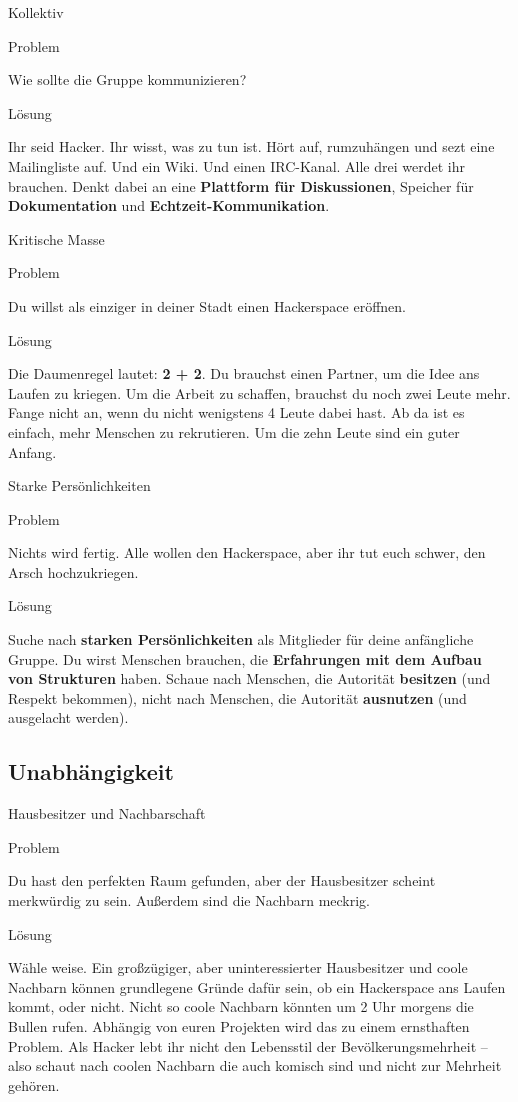\documentclass{beamer}
\newcommand{\pattern}[2]{
  \begin{alertblock}{Problem}
    #1
  \end{alertblock}
  \pause
  \begin{exampleblock}{Lösung}
    #2
  \end{exampleblock}
}
\begin{document}
  \begin{frame}{Kollektiv}
    \pattern{
      Wie sollte die Gruppe kommunizieren?
    }{
      Ihr seid Hacker. Ihr wisst, was zu tun ist. Hört auf, rumzuhängen und sezt
      eine Mailingliste auf. Und ein Wiki. Und einen IRC-Kanal. Alle drei werdet
      ihr brauchen. Denkt dabei an eine \textbf{Plattform für Diskussionen},
      Speicher für \textbf{Dokumentation} und \textbf{Echtzeit-Kommunikation}.
    }
  \end{frame}

  \begin{frame}{Kritische Masse}
    \pattern{
      Du willst als einziger in deiner Stadt einen Hackerspace eröffnen.
    }{
      Die Daumenregel lautet: \textbf{2 + 2}. Du brauchst einen Partner, um die
      Idee ans Laufen zu kriegen. Um die Arbeit zu schaffen, brauchst du noch
      zwei Leute mehr. Fange nicht an, wenn du nicht wenigstens 4 Leute dabei
      hast. Ab da ist es einfach, mehr Menschen zu rekrutieren. Um die zehn
      Leute sind ein guter Anfang.
    }
  \end{frame}

  \begin{frame}{Starke Persönlichkeiten}
    \pattern{
      Nichts wird fertig. Alle wollen den Hackerspace, aber ihr tut euch
      schwer, den Arsch hochzukriegen.
    }{
      Suche nach \textbf{starken Persönlichkeiten} als Mitglieder für deine
      anfängliche Gruppe. Du wirst Menschen brauchen, die \textbf{Erfahrungen
      mit dem Aufbau von Strukturen} haben. Schaue nach Menschen, die
      Autorität \textbf{besitzen} (und Respekt bekommen), nicht nach Menschen,
      die Autorität \textbf{ausnutzen} (und ausgelacht werden).
    }
  \end{frame}

  \subsection{Unabhängigkeit}

  \begin{frame}{Hausbesitzer und Nachbarschaft}
    \pattern{
      Du hast den perfekten Raum gefunden, aber der Hausbesitzer scheint
      merkwürdig zu sein. Außerdem sind die Nachbarn meckrig.
    }{
      Wähle weise. Ein großzügiger, aber uninteressierter Hausbesitzer und coole
      Nachbarn können grundlegene Gründe dafür sein, ob ein Hackerspace ans
      Laufen kommt, oder nicht. Nicht so coole Nachbarn könnten um 2 Uhr morgens
      die Bullen rufen. Abhängig von euren Projekten wird das zu einem
      ernsthaften Problem. Als Hacker lebt ihr nicht den Lebensstil der
      Bevölkerungsmehrheit – also schaut nach coolen Nachbarn die auch komisch
      sind und nicht zur Mehrheit gehören.
    }
  \end{frame}
\end{document}
